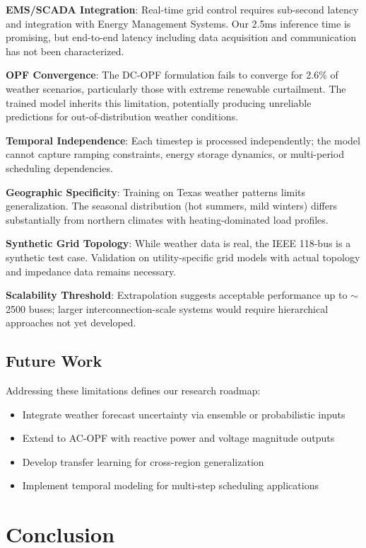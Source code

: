 \documentclass[journal,12pt,onecolumn]{IEEEtran}
\begin{document}
\textbf{EMS/SCADA Integration}: Real-time grid control requires sub-second latency and integration with Energy Management Systems. Our 2.5ms inference time is promising, but end-to-end latency including data acquisition and communication has not been characterized.

\textbf{OPF Convergence}: The DC-OPF formulation fails to converge for 2.6\% of weather scenarios, particularly those with extreme renewable curtailment. The trained model inherits this limitation, potentially producing unreliable predictions for out-of-distribution weather conditions.

\textbf{Temporal Independence}: Each timestep is processed independently; the model cannot capture ramping constraints, energy storage dynamics, or multi-period scheduling dependencies.

\textbf{Geographic Specificity}: Training on Texas weather patterns limits generalization. The seasonal distribution (hot summers, mild winters) differs substantially from northern climates with heating-dominated load profiles.

\textbf{Synthetic Grid Topology}: While weather data is real, the IEEE 118-bus is a synthetic test case. Validation on utility-specific grid models with actual topology and impedance data remains necessary.

\textbf{Scalability Threshold}: Extrapolation suggests acceptable performance up to $\sim$2500 buses; larger interconnection-scale systems would require hierarchical approaches not yet developed.

\subsection{Future Work}

Addressing these limitations defines our research roadmap:
\begin{itemize}
    \item Integrate weather forecast uncertainty via ensemble or probabilistic inputs
    \item Extend to AC-OPF with reactive power and voltage magnitude outputs
    \item Develop transfer learning for cross-region generalization
    \item Implement temporal modeling for multi-step scheduling applications
\end{itemize}

\section{Conclusion}
\label{sec:conclusion}
\end{document}

